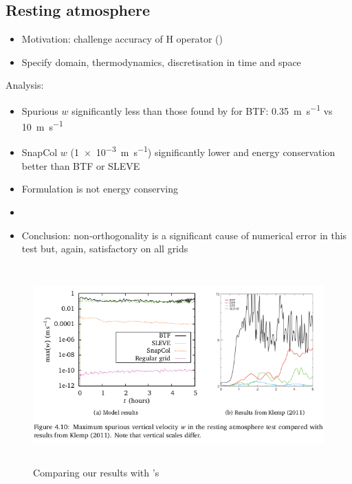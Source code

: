 \documentclass{ametsoc}
\begin{document}
\subsection{Resting atmosphere}


\begin{itemize}
	\item Motivation: challenge accuracy of H operator ()
	\item Specify domain, thermodynamics, discretisation in time and space
\end{itemize}

Analysis:
\begin{itemize}
	\item Spurious $w$ significantly less than those found by \textcite{klemp2011} for BTF: \SI{0.35}{\meter\per\second} vs \SI{10}{\meter\per\second}
	\item SnapCol $w$ (\SI{1e-3}{\meter\per\second}) significantly lower and energy conservation better than BTF or SLEVE
	\item Formulation is not energy conserving
	\item {}
	\item Conclusion: non-orthogonality is a significant cause of numerical error in this test but, again, satisfactory on all grids
\end{itemize}

\begin{figure}
	\includegraphics[height=3in]{resting-atmosphere-w.png}
%
	\caption{Comparing our results with \textcite{klemp2011}'s}
	\label{fig:resting}
\end{figure}
\end{document}
